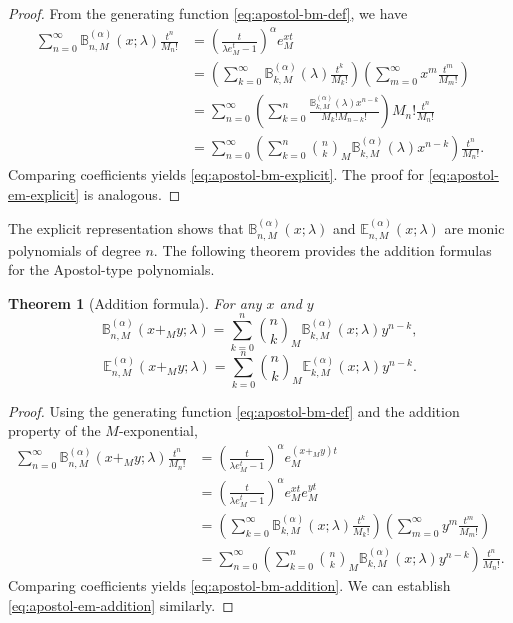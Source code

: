 \documentclass[12pt, a4paper]{article}
\newtheorem{theorem}{Theorem}[section]
\theoremstyle{definition}
\numberwithin{equation}{section}
\newcommand{\B}{\mathbb{B}}
\newcommand{\E}{\mathbb{E}}
\begin{document}
\begin{proof}
From the generating function \eqref{eq:apostol-bm-def}, we have
\begin{align*}
\sum_{n=0}^\infty \B_{n,M}^{(\alpha)}(x;\lambda)\frac{t^n}{M_n!} &= \left(\frac{t}{\lambda e_M^t-1}\right)^\alpha e_M^{xt} \\
&= \left(\sum_{k=0}^\infty \B_{k,M}^{(\alpha)}(\lambda)\frac{t^k}{M_k!}\right)\left(\sum_{m=0}^\infty x^m \frac{t^m}{M_m!}\right) \\
&= \sum_{n=0}^\infty \left(\sum_{k=0}^n \frac{\B_{k,M}^{(\alpha)}(\lambda) x^{n-k}}{M_k! M_{n-k}!}\right) M_n! \frac{t^n}{M_n!} \\
&= \sum_{n=0}^\infty \left(\sum_{k=0}^n \binom{n}{k}_M \B_{k,M}^{(\alpha)}(\lambda) x^{n-k}\right) \frac{t^n}{M_n!}.
\end{align*}
Comparing coefficients yields \eqref{eq:apostol-bm-explicit}. The proof for \eqref{eq:apostol-em-explicit} is analogous.
\end{proof}

The explicit representation shows that $\mathbb{B}_{n,M}^{(\alpha)}(x;\lambda)$ and   $\mathbb{E}_{n,M}^{(\alpha)}(x;\lambda)$ are monic polynomials of degree $n.$ The following theorem provides the addition formulas for the Apostol-type polynomials.

\begin{theorem}[Addition formula]\label{thm:addition}
For any $x$ and $y$
\begin{equation}\label{eq:apostol-bm-addition}
\B_{n,M}^{(\alpha)}(x+_M y;\lambda) = \sum_{k=0}^n \binom{n}{k}_M \B_{k,M}^{(\alpha)}(x;\lambda) y^{n-k},
\end{equation}
\begin{equation}\label{eq:apostol-em-addition}
\E_{n,M}^{(\alpha)}(x+_M y;\lambda) = \sum_{k=0}^n \binom{n}{k}_M \E_{k,M}^{(\alpha)}(x;\lambda) y^{n-k}.
\end{equation}
\end{theorem}

\begin{proof}
Using the generating function \eqref{eq:apostol-bm-def} and the addition property of the $M$-exponential,
\begin{align*}
\sum_{n=0}^\infty \B_{n,M}^{(\alpha)}(x+_M y;\lambda)\frac{t^n}{M_n!} &= \left(\frac{t}{\lambda e_M^t-1}\right)^\alpha e_M^{(x+_M y)t} \\
&= \left(\frac{t}{\lambda e_M^t-1}\right)^\alpha e_M^{xt} e_M^{yt} \\
&= \left(\sum_{k=0}^\infty \B_{k,M}^{(\alpha)}(x;\lambda)\frac{t^k}{M_k!}\right)\left(\sum_{m=0}^\infty y^m\frac{t^m}{M_m!}\right) \\
&= \sum_{n=0}^\infty \left(\sum_{k=0}^n \binom{n}{k}_M \B_{k,M}^{(\alpha)}(x;\lambda) y^{n-k}\right)\frac{t^n}{M_n!}.
\end{align*}
Comparing coefficients yields \eqref{eq:apostol-bm-addition}. We can establish \eqref{eq:apostol-em-addition} similarly.
\end{proof}
\end{document}
